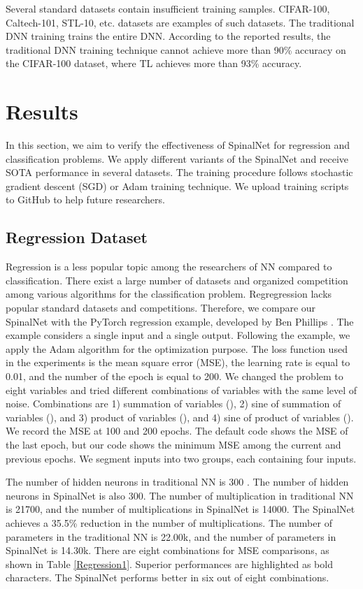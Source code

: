 \documentclass[journal]{IEEEtran}
\begin{document}
Several standard datasets contain insufficient training samples. CIFAR-100, Caltech-101, STL-10, etc. datasets are examples of such datasets. The traditional DNN training trains the entire DNN. According to the reported results, the traditional DNN training technique cannot achieve more than 90\% accuracy on the CIFAR-100 dataset, where TL achieves more than 93\% accuracy. 


\section{Results}
In this section, we aim to verify the effectiveness of SpinalNet for regression and classification problems. We apply different variants of the SpinalNet and receive SOTA performance in several datasets. The training procedure follows stochastic gradient descent (SGD) or Adam training technique. We upload training scripts to GitHub to help future researchers.   


\subsection{Regression Dataset}
Regression is a less popular topic among the researchers of NN compared to classification. There exist a large number of datasets and organized competition among various algorithms for the classification problem. Regregression lacks popular standard datasets and competitions. Therefore, we compare our SpinalNet with the PyTorch regression example, developed by Ben Phillips \cite{Regression}. The example considers a single input and a single output. Following the example, we apply the Adam algorithm \cite{kingma2014adam} for the optimization purpose. The loss function used in the experiments is the mean square error (MSE), the learning rate is equal to 0.01, and the number of the epoch is equal to 200. We changed the problem to eight variables and tried different combinations of variables with the same level of noise. Combinations are 1) summation of variables (), 2) sine of summation of variables (), and 3) product of variables (), and 4) sine of product of variables ().  We record the MSE at 100 and 200 epochs. The default code \cite{Regression} shows the MSE of the last epoch, but our code shows the minimum MSE among the current and previous epochs. We segment inputs into two groups, each containing four inputs.  

The number of hidden neurons in traditional NN is 300 \cite{Regression}. The number of hidden neurons in SpinalNet is also 300. The number of multiplication in traditional NN is 21700, and the number of multiplications in SpinalNet is 14000. The SpinalNet achieves a 35.5\% reduction in the number of multiplications. The number of parameters in the traditional NN is 22.00k, and the number of parameters in SpinalNet is 14.30k. 
There are eight combinations for MSE comparisons, as shown in Table \ref{Regression1}. Superior performances are highlighted as bold characters. The SpinalNet performs better in six out of eight combinations. 
 
\end{document}
